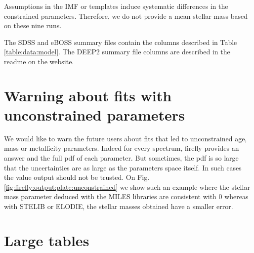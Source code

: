 \documentclass[onecolumn]{aa}
\begin{document}
Assumptions in the IMF or templates induce systematic differences in the constrained parameters. 
Therefore, we do not provide a mean stellar mass based on these nine runs.


The SDSS and eBOSS summary files contain the columns described in Table \ref{table:data:model}. The DEEP2 summary file columns are described in the readme on the website.



\section{Warning about fits with unconstrained parameters}

We would like to warn the future users about fits that led to unconstrained age, mass or metallicity parameters. 
Indeed for every spectrum, firefly provides an answer and the full pdf of each parameter. But sometimes, the pdf is so large that the uncertainties are as large as the parameters space itself. 
In such cases the value output should not be trusted. 
On Fig. \ref{fig:firefly:output:plate:unconstrained} we show such an example where the stellar mass parameter deduced with the MILES libraries are consistent with 0 whereas with STELIB or ELODIE, the stellar masses obtained have a smaller error. 

\section{Large tables}
\end{document}
